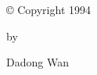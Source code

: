 \newpage


\par\vspace*{2.5in}

\begin{center}

\copyright\/ Copyright 1994

by

Dadong Wan

\end{center}











